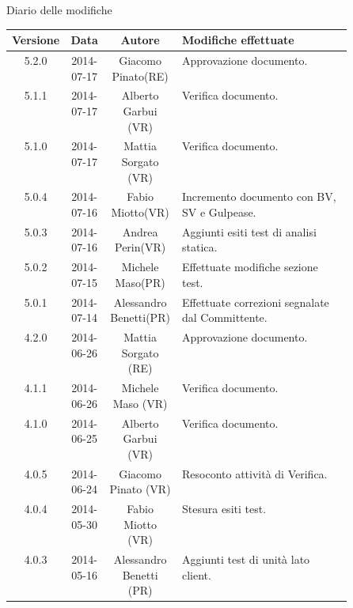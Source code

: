 
\newpage
Diario delle modifiche
\begin{center}
\begin{longtable}{|c|c|c|p{0.5\linewidth}|}
\toprule
\textbf{Versione} & \textbf{Data} & \textbf{Autore} & \textbf{Modifiche effettuate}\\

\midrule
5.2.0 & 2014-07-17 & Giacomo Pinato(RE) & Approvazione documento.\\

\midrule
5.1.1 & 2014-07-17 & Alberto Garbui (VR) & Verifica documento.\\

\midrule
5.1.0 & 2014-07-17 & Mattia Sorgato (VR) & Verifica documento.\\

\midrule
5.0.4 & 2014-07-16 & Fabio Miotto(VR) & Incremento documento con BV, SV e Gulpease.\\

\midrule
5.0.3 & 2014-07-16 & Andrea Perin(VR) & Aggiunti esiti test di analisi statica.\\

\midrule
5.0.2 & 2014-07-15 & Michele Maso(PR) & Effettuate modifiche sezione test.\\

\midrule
5.0.1 & 2014-07-14 & Alessandro Benetti(PR) & Effettuate correzioni segnalate dal Committente.\\

\midrule
4.2.0 & 2014-06-26 & Mattia Sorgato (RE) & Approvazione documento.\\

\midrule
4.1.1 & 2014-06-26 & Michele Maso (VR) & Verifica documento.\\

\midrule
4.1.0 & 2014-06-25 & Alberto Garbui (VR) & Verifica documento.\\

\midrule
4.0.5 & 2014-06-24 & Giacomo Pinato (VR) & Resoconto attività di Verifica.\\

\midrule
4.0.4 & 2014-05-30 & Fabio Miotto (VR) & Stesura esiti test.\\

\midrule
4.0.3 & 2014-05-16 & Alessandro Benetti (PR) & Aggiunti test di unità lato client.\\


\end{longtable}
\end{center}
